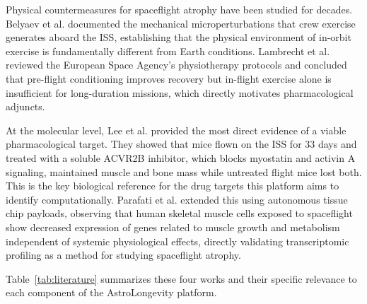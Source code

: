 \documentclass[conference]{IEEEtran}
\begin{document}
Physical countermeasures for spaceflight atrophy have been studied for decades. Belyaev et al. \cite{belyaev2011} documented the mechanical microperturbations that crew exercise generates aboard the ISS, establishing that the physical environment of in-orbit exercise is fundamentally different from Earth conditions. Lambrecht et al. \cite{lambrecht2017} reviewed the European Space Agency's physiotherapy protocols and concluded that pre-flight conditioning improves recovery but in-flight exercise alone is insufficient for long-duration missions, which directly motivates pharmacological adjuncts.

At the molecular level, Lee et al. \cite{lee2020} provided the most direct evidence of a viable pharmacological target. They showed that mice flown on the ISS for 33 days and treated with a soluble ACVR2B inhibitor, which blocks myostatin and activin A signaling, maintained muscle and bone mass while untreated flight mice lost both. This is the key biological reference for the drug targets this platform aims to identify computationally. Parafati et al. \cite{parafati2023} extended this using autonomous tissue chip payloads, observing that human skeletal muscle cells exposed to spaceflight show decreased expression of genes related to muscle growth and metabolism independent of systemic physiological effects, directly validating transcriptomic profiling as a method for studying spaceflight atrophy.

Table~\ref{tab:literature} summarizes these four works and their specific relevance to each component of the AstroLongevity platform.
\end{document}
